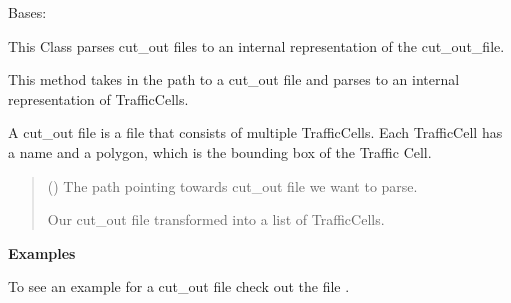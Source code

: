 \documentclass[letterpaper,10pt,english]{sphinxmanual}
\begin{document}
\begin{fulllineitems}
\label{\detokenize{apidoc/src.osm_configurator.model.parser:src.osm_configurator.model.parser.cutOut_parser_interface.CutOutParserInterface}}
\pysigstartsignatures
{}
\pysigstopsignatures
\sphinxAtStartPar
Bases: 

\sphinxAtStartPar
This Class parses cut\_out files to an internal representation of the cut\_out\_file.

\begin{fulllineitems}
\label{\detokenize{apidoc/src.osm_configurator.model.parser:src.osm_configurator.model.parser.cutOut_parser_interface.CutOutParserInterface.parse_cutout_file}}
\pysigstartsignatures
{}
\pysigstopsignatures
\sphinxAtStartPar
This method takes in the path to a cut\_out file and parses to an
internal representation of TrafficCells.

\sphinxAtStartPar
A cut\_out file is a  file that consists of multiple TrafficCells. Each TrafficCell has
a name and a polygon, which is the bounding box of the Traffic Cell.
\begin{quote}\begin{description}
\sphinxAtStartPar
{} () \textendash{} The path pointing towards cut\_out file we want to parse.

\sphinxAtStartPar
Our cut\_out file transformed into a list of TrafficCells.

\sphinxAtStartPar
{}

\end{description}\end{quote}
\textbf{Examples}

\sphinxAtStartPar
To see an example for a cut\_out file check out the file .

\end{fulllineitems}


\end{fulllineitems}
\end{document}
